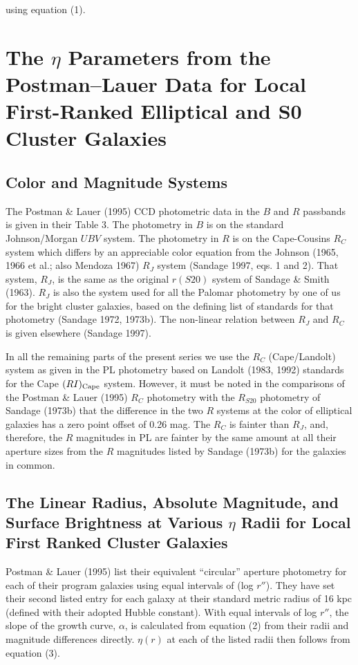 \documentclass[preprint]{aastex}
\begin{document}
\noindent using equation (1). 

\section{The $\eta$ Parameters from the Postman--Lauer Data for
Local First-Ranked Elliptical and S0 Cluster Galaxies}

\subsection{Color and Magnitude Systems}

The Postman \& Lauer (1995) CCD photometric data in the $B$ and $R$
passbands is given in their Table 3. The photometry in $B$ is on the
standard Johnson/Morgan $UBV$ system. The photometry in $R$ is on the
Cape-Cousins $R_C$ system which differs by an appreciable color
equation from the Johnson (1965, 1966 et al.; also Mendoza 1967) $R_J$
system (Sandage 1997, eqs. 1 and 2). That system, $R_J$, is the same
as the original $r(S20)$ system of Sandage \& Smith (1963).  $R_J$ is
also the system used for all the Palomar photometry by one of us for
the bright cluster galaxies, based on the defining list of standards
for that photometry (Sandage 1972, 1973b). The non-linear relation
between $R_J$ and $R_C$ is given elsewhere (Sandage 1997).  

In all the remaining parts of the present series we use the $R_C$
(Cape/Landolt) system as given in the PL photometry based on Landolt
(1983, 1992) standards for the Cape $(RI)_{\rm Cape}$ system.
However, it must be noted in the comparisons of the Postman \& Lauer
(1995) $R_C$ photometry with the $R_{S20}$ photometry of Sandage
(1973b) that the difference in the two $R$ systems at the color of
elliptical galaxies has a zero point offset of 0.26 mag. The $R_C$ is
fainter than $R_J$, and, therefore, the $R$ magnitudes in PL are
fainter by the same amount at all their aperture sizes from the $R$
magnitudes listed by Sandage (1973b) for the galaxies in common.

\subsection{The Linear Radius, Absolute Magnitude, and Surface Brightness at Various $\eta$ Radii for Local First Ranked Cluster Galaxies}

Postman \& Lauer (1995) list their equivalent ``circular'' aperture
photometry for each of their program galaxies using equal intervals of
(log $r''$). They have set their second listed entry for each galaxy
at their standard metric radius of 16 kpc (defined with their adopted
Hubble constant). With equal intervals of log $r''$, the slope of the
growth curve, $\alpha$, is calculated from equation (2) from their
radii and magnitude differences directly. $\eta(r)$ at each of the
listed radii then follows from equation (3).
\end{document}
